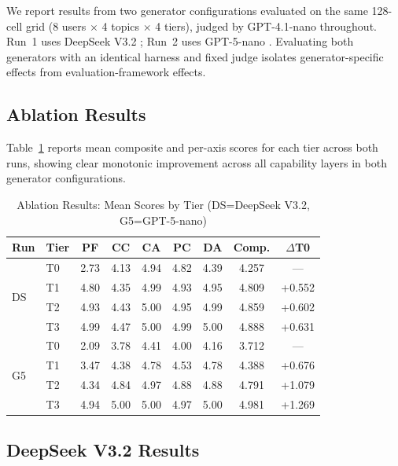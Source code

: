 \documentclass[conference]{IEEEtran}
\begin{document}
We report results from two generator configurations evaluated on the same 128-cell grid (8 users $\times$ 4 topics $\times$ 4 tiers), judged by GPT-4.1-nano throughout. Run~1 uses DeepSeek V3.2 \cite{b15}; Run~2 uses GPT-5-nano \cite{b16}. Evaluating both generators with an identical harness and fixed judge isolates generator-specific effects from evaluation-framework effects.

\subsection{Ablation Results}

Table~\ref{tab:ablation_results} reports mean composite and per-axis scores for each tier across both runs, showing clear monotonic improvement across all capability layers in both generator configurations.

\begin{table}[htbp]
\caption{Ablation Results: Mean Scores by Tier (DS=DeepSeek V3.2, G5=GPT-5-nano)}
\label{tab:ablation_results}
\begin{center}
\scriptsize
\setlength{\tabcolsep}{6pt}
\begin{tabular}{llccccccc}
\toprule
\textbf{Run} & \textbf{Tier} & \textbf{PF} & \textbf{CC} & \textbf{CA} & \textbf{PC} & \textbf{DA} & \textbf{Comp.} & \textbf{$\Delta$T0} \\
\midrule
\multirow{4}{*}{DS}
 & T0 & 2.73 & 4.13 & 4.94 & 4.82 & 4.39 & 4.257 & --- \\
 & T1 & 4.80 & 4.35 & 4.99 & 4.93 & 4.95 & 4.809 & +0.552 \\
 & T2 & 4.93 & 4.43 & 5.00 & 4.95 & 4.99 & 4.859 & +0.602 \\
 & T3 & 4.99 & 4.47 & 5.00 & 4.99 & 5.00 & 4.888 & +0.631 \\
\midrule
\multirow{4}{*}{G5}
 & T0 & 2.09 & 3.78 & 4.41 & 4.00 & 4.16 & 3.712 & --- \\
 & T1 & 3.47 & 4.38 & 4.78 & 4.53 & 4.78 & 4.388 & +0.676 \\
 & T2 & 4.34 & 4.84 & 4.97 & 4.88 & 4.88 & 4.791 & +1.079 \\
 & T3 & 4.94 & 5.00 & 5.00 & 4.97 & 5.00 & 4.981 & +1.269 \\
\bottomrule
\end{tabular}
\end{center}
\end{table}

\subsection{DeepSeek V3.2 Results}
\end{document}
